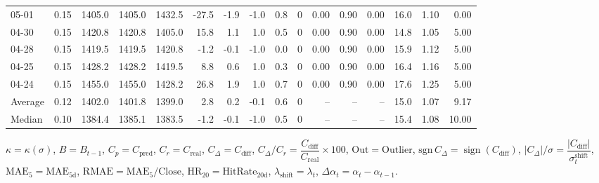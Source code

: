 \begin{threeparttable}
{\begin{tabular}{lrrrrrrrrrrrrrrr}
  05-01 &     0.15 & 1405.0 & 1405.0 & 1432.5 &      -27.5 &           -1.9 &                     -1.0 &                 0.8 &              0 &       0.00 &      0.90 &           0.00 &             16.0 &            1.10 &                   0.00 \\
  04-30 &     0.15 & 1420.8 & 1420.8 & 1405.0 &       15.8 &            1.1 &                      1.0 &                 0.5 &              0 &       0.00 &      0.90 &           0.00 &             14.8 &            1.05 &                   5.00 \\
  04-28 &     0.15 & 1419.5 & 1419.5 & 1420.8 &       -1.2 &           -0.1 &                     -1.0 &                 0.0 &              0 &       0.00 &      0.90 &           0.00 &             15.9 &            1.12 &                   5.00 \\
  04-25 &     0.15 & 1428.2 & 1428.2 & 1419.5 &        8.8 &            0.6 &                      1.0 &                 0.3 &              0 &       0.00 &      0.90 &           0.00 &             16.4 &            1.16 &                   5.00 \\
  04-24 &     0.15 & 1455.0 & 1455.0 & 1428.2 &       26.8 &            1.9 &                      1.0 &                 0.7 &              0 &       0.00 &      0.90 &           0.00 &             17.6 &            1.25 &                   5.00 \\
Average &     0.12 & 1402.0 & 1401.8 & 1399.0 &        2.8 &            0.2 &                     -0.1 &                 0.6 &              0 &         -- &        -- &             -- &             15.0 &            1.07 &                   9.17 \\
 Median &     0.10 & 1384.4 & 1385.1 & 1383.5 &       -1.2 &           -0.1 &                     -1.0 &                 0.5 &              0 &         -- &        -- &             -- &             15.4 &            1.08 &                  10.00 \\
\bottomrule
\end{tabular}
}
\begin{tablenotes}\footnotesize
\item $\kappa=\kappa(\sigma)$, $B=B_{t-1}$, $C_p=C_{\text{pred}}$, $C_r=C_{\text{real}}$, $C_\Delta=C_{\text{diff}}$, $C_\Delta/C_r=\dfrac{C_{\text{diff}}}{C_{\text{real}}}\times100$, $\mathrm{Out}=\text{Outlier}$, $\mathrm{sgn}\,C_\Delta=\operatorname{sign}(C_{\text{diff}})$, $|C_\Delta|/\sigma=\dfrac{|C_{\text{diff}}|}{\sigma_t^{\text{shift}}}$, $\mathrm{MAE}_5=\mathrm{MAE}_{5\text{d}}$, $\mathrm{RMAE}= \mathrm{MAE}_5 / \text{Close}$, $\mathrm{HR}_{20}=\mathrm{HitRate}_{20\text{d}}$, 
$\lambda_{\text{shift}}=\lambda_t$, 
$\Delta\alpha_t=\alpha_t-\alpha_{t-1}$.
\end{tablenotes}
\end{threeparttable}
\endgroup

